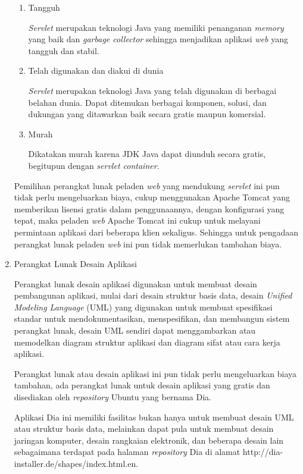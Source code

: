\documentclass[pdftex,12pt, oneside]{article}
\begin{document}
\begin{enumerate}
\begin{enumerate}
		\item Tangguh
		
\textit{Servlet} merupakan teknologi Java yang memiliki penanganan \textit{memory} yang baik dan \textit{garbage collector} sehingga menjadikan aplikasi \textit{web} yang tangguh dan stabil.		
		
		\item Telah digunakan dan diakui di dunia
		
\textit{Servlet} merupakan teknologi Java yang telah digunakan di berbagai belahan dunia. Dapat ditemukan berbagai komponen, solusi, dan dukungan yang ditawarkan baik secara gratis maupun komersial.		
		
		\item Murah
		
Dikatakan murah karena JDK Java dapat diunduh secara gratis, begitupun dengan \textit{servlet container}.		
		
	\end{enumerate}
	
Pemilihan perangkat lunak peladen \textit{web} yang mendukung \textit{servlet} ini pun tidak perlu mengeluarkan biaya, cukup menggunakan Apache Tomcat yang memberikan lisensi gratis dalam penggunaannya, dengan konfigurasi yang tepat, maka peladen \textit{web} Apache Tomcat ini cukup untuk melayani permintaan aplikasi dari beberapa klien sekaligus. Sehingga untuk pengadaan perangkat lunak peladen \textit{web} ini pun tidak memerlukan tambahan biaya.	
	
	\item Perangkat Lunak Desain Aplikasi
	
Perangkat lunak desain aplikasi digunakan untuk membuat desain pembangunan aplikasi, mulai dari desain struktur basis data, desain \textit{Unified Modeling Language} (UML) yang digunakan untuk membuat spesifikasi standar untuk mendokumentasikan, menspesifikan, dan membangun sistem perangkat lunak, desain UML sendiri dapat menggambarkan atau memodelkan diagram struktur aplikasi dan diagram sifat atau cara kerja aplikasi.

Perangkat lunak atau desain aplikasi ini pun tidak perlu mengeluarkan biaya tambahan, ada perangkat lunak untuk desain aplikasi yang gratis dan disediakan oleh \textit{repository} Ubuntu yang bernama Dia.

Aplikasi Dia ini memiliki fasilitas bukan hanya untuk membuat desain UML atau struktur basis data, melainkan dapat pula untuk membuat desain jaringan komputer, desain rangkaian elektronik, dan beberapa desain lain sebagaimana terdapat pada halaman \textit{repository} Dia di alamat http://dia-installer.de/shapes/index.html.en.
	

\end{enumerate}
\end{document}
